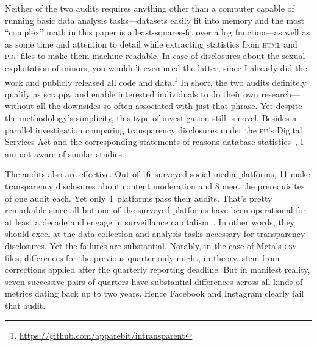 \documentclass[nonacm,screen]{acmart}
\newcommand\V[1]{\textsc{\MakeLowercase{#1}}}
\begin{document}
Neither of the two audits requires anything other than a computer capable of
running basic data analysis tasks---datasets easily fit into memory and the most
``complex'' math in this paper is a least-squares-fit over a log function---as
well as as some time and attention to detail while extracting statistics from
\V{HTML} and \V{PDF} files to make them machine-readable. In case of disclosures
about the sexual exploitation of minors, you wouldn't even need the latter,
since I already did the work and publicly released all code and
data.\footnote{\label{fn:intransparent}\url{https://github.com/apparebit/intransparent}}
In short, the two audits definitely qualify as scrappy and enable interested
individuals to do their own research---without all the downsides so often
associated with just that phrase. Yet despite the methodology's simplicity, this
type of investigation still is novel. Besides a parallel investigation comparing
transparency disclosures under the \V{EU}'s Digital Services Act and the
corresponding statements of reasons database
statistics~\cite{TrujilloFagniea2024}, I am not aware of similar studies.

The audits also are effective. Out of 16~surveyed social media platforms, 11
make transparency disclosures about content moderation and 8 meet the
prerequisites of one audit each. Yet only 4~platforms pass their audits. That's
pretty remarkable since all but one of the surveyed platforms have been
operational for at least a decade and engage in surveillance
capitalism~\cite{Zuboff2019}. In other words, they should excel at the data
collection and analysis tasks necessary for transparency disclosures. Yet the
failures are substantial. Notably, in the case of Meta's \V{CSV} files,
differences for the previous quarter only might, in theory, stem from
corrections applied after the quarterly reporting deadline. But in manifest
reality, seven successive pairs of quarters have substantial differences across
all kinds of metrics dating back up to two years. Hence Facebook and Instagram
clearly fail that audit.
\end{document}
